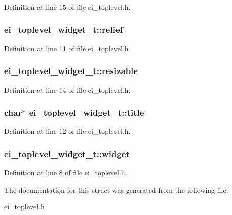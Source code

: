 Definition at line 15 of file ei\_\-toplevel.h.\hypertarget{structei__toplevel__widget__t_a92adf50fe36268b41d17024ee6338ce0}{
\subsubsection[{relief}]{ {\bf ei\_\-toplevel\_\-widget\_\-t::relief}}}
\label{structei__toplevel__widget__t_a92adf50fe36268b41d17024ee6338ce0}


Definition at line 11 of file ei\_\-toplevel.h.\hypertarget{structei__toplevel__widget__t_a2f1fffc879dd73e27a0b70ff3a152fc5}{
\subsubsection[{resizable}]{ {\bf ei\_\-toplevel\_\-widget\_\-t::resizable}}}
\label{structei__toplevel__widget__t_a2f1fffc879dd73e27a0b70ff3a152fc5}


Definition at line 14 of file ei\_\-toplevel.h.\hypertarget{structei__toplevel__widget__t_a6ed66d8c09149914ebf42fd122df33dc}{
\subsubsection[{title}]{\setlength{\rightskip}{0pt plus 5cm}char$\ast$ {\bf ei\_\-toplevel\_\-widget\_\-t::title}}}
\label{structei__toplevel__widget__t_a6ed66d8c09149914ebf42fd122df33dc}


Definition at line 12 of file ei\_\-toplevel.h.\hypertarget{structei__toplevel__widget__t_a72894e216cd78fbfe56f6e834ece4385}{
\subsubsection[{widget}]{ {\bf ei\_\-toplevel\_\-widget\_\-t::widget}}}
\label{structei__toplevel__widget__t_a72894e216cd78fbfe56f6e834ece4385}


Definition at line 8 of file ei\_\-toplevel.h.

The documentation for this struct was generated from the following file:\begin{DoxyCompactItemize}
\item 
\hyperlink{ei__toplevel_8h}{ei\_\-toplevel.h}\end{DoxyCompactItemize}
